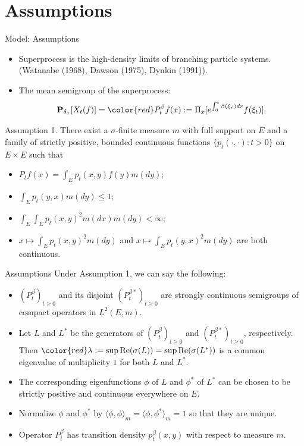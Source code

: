 \documentclass[xcolor=dvipsnames]{beamer}
\begin{document}
\section{Assumptions}

\begin{frame}{Model: Assumptions}
\begin{itemize}
\item
  Superprocess is the high-density limits of branching particle systems. (Watanabe (1968), Dawson (1975), Dynkin (1991)).
\item
The mean semigroup of the superprocess:
\[
\mathbf P_{\delta_x} [X_t(f)] = {\color{red} P_t^\beta} f(x) := \Pi_x[e^{\int_0^{t} \beta (\xi_r) dr}f(\xi_t)].
\]
\end{itemize}
\begin{block}{Assumption 1.}   
  There exist a $\sigma$-finite measure {\color{red} $m$} with full support on $E$ and a family of strictly positive,
	bounded continuous functions $\{ p_t(\cdot,\cdot): t > 0 \}$ on $E \times E$ such that
\begin{itemize}
\item $P_tf(x)= \int_E p_t(x,y) f(y) m(dy);$
\item $\int_E p_t(y,x)m(dy) \leq 1;$
\item $\int_E \int_E p_t(x,y)^2 m(dx) m(dy)
	<\infty;$
\item
	$x \mapsto \int_E p_t(x,y)^2 m(dy)$ and $x \mapsto \int_E p_t(y,x)^2 m(dy)$ are both continuous.
\end{itemize}
\end{block}
\end{frame}

\begin{frame}{Assumptions}
Under Assumption 1, we can say the following:
\begin{itemize}
\item
$(P^\beta_t)_{t \geq 0}$ and its disjoint $(P^{\beta *}_t)_{t \geq 0}$ are strongly continuous semigroups of compact operators in $L^2(E,m)$.
\item
Let $L$ and $L^*$ be the generators of $(P^\beta_t)_{t \geq 0}$ and $(P^{\beta *}_t)_{t \geq 0}$, respectively. 
Then ${\color{red} \lambda} := \sup \text{Re}(\sigma(L)) = \sup \text{Re}(\sigma(L^*))$ is a common {\color{red}eigenvalue} of multiplicity $1$ for both $L$ and $L^*$.
\item
The corresponding {\color{red}eigenfunctions} {\color{red} $\phi$} of $L$ and {\color{red} $\phi^*$} of $L^*$ can be chosen to be strictly positive and continuous everywhere on $E$.
\item
Normalize $\phi$ and $\phi^*$ by $\langle\phi, \phi\rangle_m = \langle\phi,\phi^*\rangle_m = 1$ so that they are unique.
\item
Operator $P_t^\beta$ has transition density {\color{red}$p_t^\beta(x,y)$} with respect to measure $m$.
\end{itemize}
\end{frame}
\end{document}
